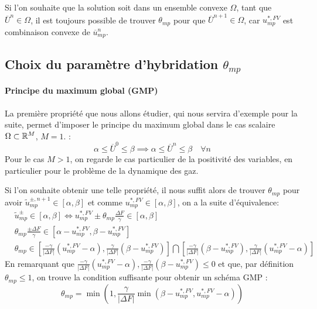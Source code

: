 Si l'on souhaite que la solution soit dans un ensemble convexe $\Omega$, tant que $\overline{{U}}^{n} \in \Omega$, 
il est toujours possible de trouver $\theta_{mp}$ pour que $\overline{{U}}^{n+1} \in \Omega$, car ${u}_{mp}^{*,FV}$ est combinaison convexe de $ \overline{{u}}_{mp}^{n}$.

\subsection{Choix du paramètre d'hybridation $\theta_{mp}$}

\paragraph{Principe du maximum global (GMP)}
La première propriété que nous allons étudier, qui nous servira d’exemple pour la suite, permet d'imposer le principe du maximum global dans le cas scalaire $\Omega \subset \mathbb{R}^M$, $M=1$. : 
$$ \alpha \leq \overline{U}^{0} \leq \beta \implies \alpha \leq \overline{U}^{n} \leq \beta \quad \forall n$$
Pour le cas $M>1$, on regarde le cas particulier de la positivité des variables, en particulier pour le problème de la dynamique des gaz.

Si l'on souhaite obtenir une telle propriété, il nous suffit alors de trouver $\theta_{mp}$ pour avoir $\widetilde{{u}}_{mp}^{\pm,n+1}\in \left[\alpha,\beta\right]$ et comme ${u}_{mp}^{*,FV}\in \left[\alpha,\beta\right]$, on a la suite d'équivalence:
\begin{align*}
    &\widetilde{{u}}_{mp}^{\pm}\in \left[\alpha,\beta\right] \iff {u}_{mp}^{*,FV} \pm \theta_{mp} \frac{\Delta F}{\gamma}\in \left[\alpha,\beta\right] \\
    &\theta_{mp} \frac{\pm \Delta F}{\gamma} \in  \left[\alpha-{u}_{mp}^{*,FV},\beta-{u}_{mp}^{*,FV}\right] \\
    &\theta_{mp} \in \left[\frac{-\gamma}{|\Delta F|} \left({u}_{mp}^{*,FV} - \alpha \right), \frac{\gamma}{|\Delta F|}\left(\beta-{u}_{mp}^{*,FV}     \right) \right] \bigcap 
                     \left[\frac{-\gamma}{|\Delta F|} \left(\beta-{u}_{mp}^{*,FV}    \right), \frac{\gamma}{|\Delta F|}\left({u}_{mp}^{*,FV} - \alpha  \right) \right]
\end{align*}
En remarquant que $\frac{-\gamma}{|\Delta F|} \left({u}_{mp}^{*,FV} - \alpha \right),\frac{-\gamma}{|\Delta F|}\left(\beta-{u}_{mp}^{*,FV}\right)  \leq 0 $ et que, par définition $\theta_{mp} \leq 1$,
on trouve la condition suffisante pour obtenir un schéma GMP : 
\begin{equation}
\theta_{mp} = \min \left(1, \frac{\gamma}{|\Delta F|} \min \left(\beta-{u}_{mp}^{*,FV},{u}_{mp}^{*,FV} - \alpha  \right) \right) 
\end{equation}

